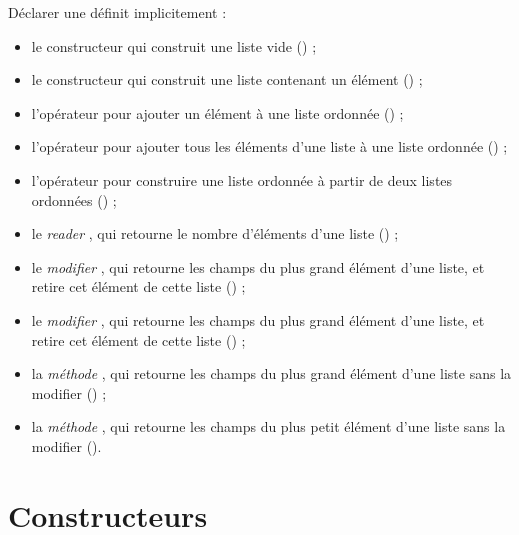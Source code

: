 Déclarer une  définit implicitement :
\begin{itemize}
  \item le constructeur  qui construit une liste vide () ;
  \item le constructeur  qui construit une liste contenant un élément () ;
  \item l'opérateur \galgas{+=} pour ajouter un élément à une liste ordonnée () ;
  \item l'opérateur  pour ajouter tous les éléments d'une liste à une liste ordonnée () ;
  \item l'opérateur  pour construire une liste ordonnée à partir de deux listes ordonnées () ;
  \item le \emph{reader} , qui retourne le nombre d'éléments d'une liste () ;
  \item le \emph{modifier} , qui retourne les champs du plus grand élément d'une liste, et retire cet élément de cette liste () ;
  \item le \emph{modifier} , qui retourne les champs du plus grand élément d'une liste, et retire cet élément de cette liste () ;
  \item la \emph{méthode} , qui retourne les champs du plus grand élément d'une liste sans la modifier () ;
  \item la \emph{méthode} , qui retourne les champs du plus petit élément d'une liste sans la modifier ().
\end{itemize}








\section{Constructeurs}


